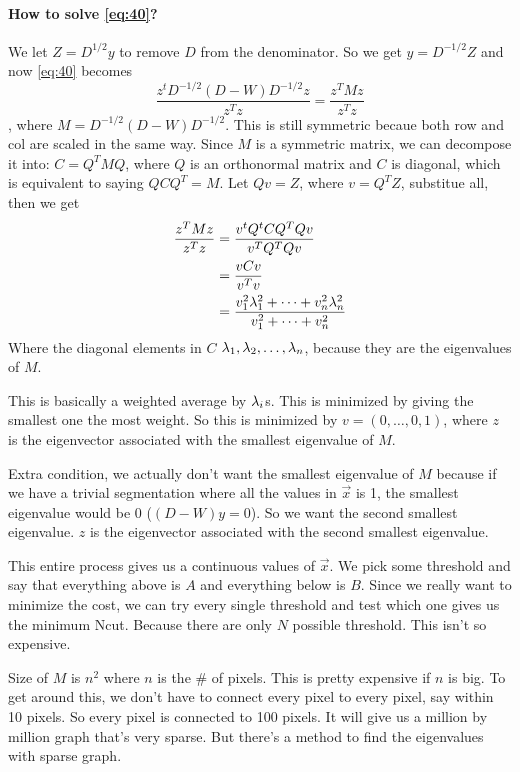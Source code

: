\paragraph{How to solve \eqref{eq:40}?}
We let $Z = D^{1/2}y$ to remove $D$ from the denominator. So we get $y
= D^{-1/2}Z$ and now \eqref{eq:40} becomes $$\frac{z^t
  D^{-1/2}(D-W)D^{-1/2}z}{z^Tz} = \frac{z^TMz}{z^Tz}$$, where $M =
D^{-1/2}(D-W)D^{-1/2}$. This is still symmetric becaue both row and
col are scaled in the same way. Since $M$ is a symmetric matrix, we
can decompose it into:
$C = Q^TMQ$, where $Q$ is an orthonormal matrix and $C$ is diagonal,
which is equivalent to saying $QCQ^T = M$. Let $Qv = Z$,  where $v =
Q^TZ$, substitue all, then we get
\begin{align*}
\frac{z^TMz}{z^Tz}&=\frac{v^tQ^tCQ^TQv}{v^TQ^TQv}\\
&=\frac{vCv}{v^Tv}\\
&= \frac{v_1^2\lambda_1^2 + \cdots + v_n^2\lambda_n^2 }{v_1^2 + \cdots + v_n^2}
\end{align*}
Where the diagonal elements in $C$ $\lambda_1, \lambda_2, \dots,
\lambda_n$, because they are the eigenvalues of $M$.

This is basically a weighted average by $\lambda_i$s. This is minimized
by giving the smallest one the most weight. So this is minimized by $v
= (0, \dots, 0, 1)$, where $z$ is the eigenvector associated with the
smallest eigenvalue of $M$.

Extra condition, we actually don't want the smallest eigenvalue of $M$ because if we
have a trivial segmentation where all the values in $\vec x$ is 1,
the smallest eigenvalue would be 0 ($(D-W)y = 0$). So we want the
second smallest eigenvalue. $z$ is the eigenvector associated with the
second smallest eigenvalue.

This entire process gives us a continuous values of $\vec x$. We pick
some threshold and say that everything above is $A$ and everything
below is $B$. Since we really want to minimize the cost, we can try
every single threshold and test which one gives us the minimum
Ncut. Because there are only $N$ possible threshold. This isn't so expensive.

Size of $M$ is $n^2$ where $n$ is the \# of pixels. This is pretty expensive
if $n$ is big. To get around this, we don't have to connect every
pixel to every pixel, say within 10 pixels. So every pixel is
connected to 100 pixels. It will give us a million by million graph
that's very sparse. But there's a method to find the eigenvalues with
sparse graph.

